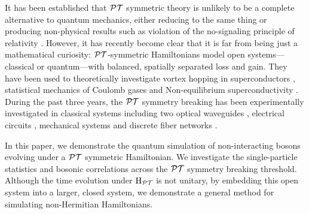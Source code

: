 It has been established that \(\mathcal{PT}\) symmetric theory is unlikely to be a
complete alternative to quantum mechanics, either reducing to the same thing
\cite{mostafazadeh-jmathphys-43-205} or producing non-physical results such as
violation of the no-signaling principle of relativity \cite{lee-prl-112-130404}.
However, it has recently become clear that it is far from being just a
mathematical curiosity: \(\mathcal{PT}\)-symmetric Hamiltonians model open
systems---classical or quantum---with balanced, spatially separated loss and
gain. They have been used to theoretically investigate vortex hopping in
superconductors \cite{naomichi-physrevlett-77-570},
statistical mechanics of Coulomb gases \cite{gulden-jetp-117-517} and
Non-equilibrium superconductivity \cite{rubinstein-physrevlett-99-167003,
serbyn-physrevb-87-020501}. During the past three years, the \(\mathcal{PT}\)
symmetry breaking has been experimentally investigated in classical systems
including two optical waveguides \cite{ruter-natphys-6-192}, electrical circuits
\cite{schindler-physreva-84-040101}, mechanical systems
\cite{bender-amjphys-81-173} and discrete fiber networks
\cite{regensburger-nat-488-167}.

In this paper, we demonstrate the quantum simulation of non-interacting bosons
evolving under a \(\mathcal{PT}\) symmetric
Hamiltonian. We investigate the single-particle statistics and bosonic
correlations across the \(\mathcal{PT}\) symmetry breaking threshold. Although the time
evolution under \(\mathrm{H}_{\mathcal{PT}}\) is not unitary, by embedding this open system
into a larger, closed system, we demonstrate a general method for simulating
non-Hermitian Hamiltonians.

